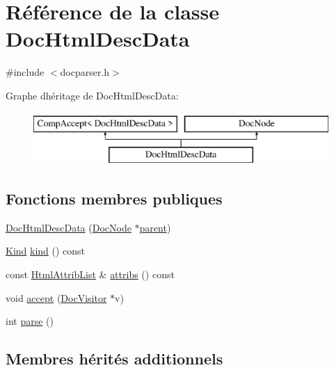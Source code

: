 \hypertarget{class_doc_html_desc_data}{}\section{Référence de la classe Doc\+Html\+Desc\+Data}
\label{class_doc_html_desc_data}


{\ttfamily \#include $<$docparser.\+h$>$}

Graphe d\textquotesingle{}héritage de Doc\+Html\+Desc\+Data\+:\begin{figure}[H]
\begin{center}
\leavevmode
\includegraphics[height=2.000000cm]{class_doc_html_desc_data}
\end{center}
\end{figure}
\subsection*{Fonctions membres publiques}
\begin{DoxyCompactItemize}
\item 
\hyperlink{class_doc_html_desc_data_ae326119d544a16082f417b43abe3b6b5}{Doc\+Html\+Desc\+Data} (\hyperlink{class_doc_node}{Doc\+Node} $\ast$\hyperlink{class_doc_node_a990d8b983962776a647e6231d38bd329}{parent})
\item 
\hyperlink{class_doc_node_aebd16e89ca590d84cbd40543ea5faadb}{Kind} \hyperlink{class_doc_html_desc_data_a2a4d493b0a381d7b877a88427710c336}{kind} () const 
\item 
const \hyperlink{class_html_attrib_list}{Html\+Attrib\+List} \& \hyperlink{class_doc_html_desc_data_a60b0a31bc2fb6758c039385c4a7e9a4c}{attribs} () const 
\item 
void \hyperlink{class_doc_html_desc_data_a4c69206e824affc9734c2a02c2ec912e}{accept} (\hyperlink{class_doc_visitor}{Doc\+Visitor} $\ast$v)
\item 
int \hyperlink{class_doc_html_desc_data_ae3eeaf6df34a38595797546e019224b8}{parse} ()
\end{DoxyCompactItemize}
\subsection*{Membres hérités additionnels}


